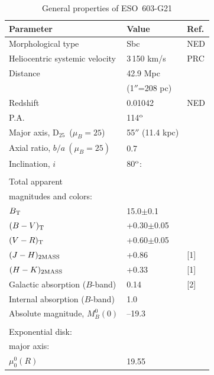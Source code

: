 \documentclass{aa}
\begin{document}
\begin{table}
\caption{General properties of ESO~603-G21}
\begin{tabular}{lll}
\hline
Parameter &  Value & Ref. \\
\hline
Morphological type             & Sbc          &  NED   \\
Heliocentric systemic velocity & 3\,150 km/s    &  PRC   \\
Distance                       & 42.9 Mpc     &      \\
                               & (1$''$=208 pc)&     \\
Redshift                       & 0.01042      &  NED  \\
P.A.                           & 114$^{\rm o}$ &                 \\
Major axis, D$_{25}$~($\mu_B=25$) & 55$''$ (11.4 kpc) &               \\
Axial ratio, $b/a~(\mu_B=25)$   & 0.7           &              \\
Inclination, $i$               & 80$^{\rm o}$:  &            \\
                               &                &             \\
Total apparent                 &                          &      \\
magnitudes and colors:         &                          &      \\
$B_{\rm T}$                          & 15.0$\pm$0.1 &      \\
$(B-V)_{\rm T}$                      & +0.30$\pm$0.05 &   \\
$(V-R)_{\rm T}$                      & +0.60$\pm$0.05 &   \\
$(J-H)_{\rm 2MASS}$            & +0.86          & [1]       \\
$(H-K)_{\rm 2MASS}$            & +0.33          & [1]       \\
Galactic absorption ($B$-band) & 0.14           & [2] \\
Internal absorption ($B$-band) & 1.0            &     \\
Absolute magnitude, $M_B^0(0)$ & --19.3         &     \\
                               &                &     \\
Exponential disk:              &                &     \\
major axis:                    &                &     \\
$\mu_0^0(R)$                   & 19.55          &     \\

\end{tabular}
\end{table}
\end{document}
